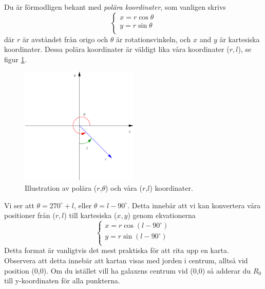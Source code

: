 Du är förmodligen bekant med \emph{polära koordinater}, som vanligen skrivs
\begin{equation}
\left\{ 
\begin{array}{l}
x=r \cos \theta \\
y=r \sin \theta \\
\end{array}
\right.
\label{eqn:polar}
\end{equation} 
där $r$ är avståndet från origo och $\theta$ är rotationsvinkeln, och $x$ and $y$ 
är kartesiska koordinater.  Dessa polära koordinater är väldigt lika våra koordinater
($r, l$), se figur \ref{fig:polar}.
\begin{figure}[ht]
\begin{center}
\includegraphics[width=0.5\textwidth]{../figures/coordinate.pdf}
\caption{Illustration av polära ($r$,$\theta$) och våra 
  ($r$,$l$) koordinater.}
\label{fig:polar}
\end{center}
\end{figure}
Vi ser att $\theta=270^\circ +l$, eller $\theta=l-90^\circ$. Detta innebär att vi kan konvertera våra positioner 
från ($r, l$) till kartesiska ($x, y$) genom ekvationerna
\begin{equation}
	\boxed{
\left\{ 
\begin{array}{l}
	x=r \cos (l-90^\circ) \\
	y=r \sin (l-90^\circ) \\
\end{array}
\right.}
\label{eqn:rpmtocart}
\end{equation} 
Detta format är vanligtvis det mest praktiska för att rita upp en karta. Observera att detta innebär att kartan visas
med jorden i centrum, alltså vid position (0,0). Om du istället vill ha galaxens centrum vid (0,0) så adderar du
$R_0$ till y-koordinaten för alla punkterna.


